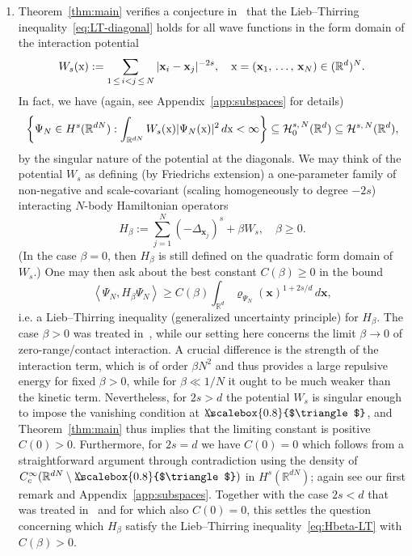 \documentclass[10pt]{amsart}
\theoremstyle{definition}\newtheorem{defi}[theo]{Definition}\newtheorem{rema}[theo]{Remark}\newtheorem{exam}[theo]{Example}\newtheorem{exem}[theo]{Example}\newtheorem{nota}[theo]{Notation}
\newcommand*\R {\mathbb{R}}
\newcommand\1{{\ensuremath {\mathds 1} }}
\newcommand{\bx}{\mathbf{x}}
\newcommand{\cH}{\mathcal{H}}
\newcommand{\sx}{\textup{x}}
\newcommand{\bDelta}{{\mbox{$\triangle$}\hspace{-8.6pt}\scalebox{0.8}{$\triangle$}}}
\begin{document}
\begin{enumerate}
\item Theorem~\ref{thm:main} verifies a conjecture in~\cite[p.~1362]{LunNamPor-16} that the Lieb--Thirring inequality~\eqref{eq:LT-diagonal} holds for all wave functions in the form domain of the interaction potential
\[
W_s(\sx) := \sum_{1\,\le\,i<j\,\le\,N} |\bx_i-\bx_j|^{-2s}, \quad \sx=(\bx_1,\,\ldots,\,\bx_N)\in (\R^d)^N.
\]
In fact, we have (again, see Appendix~\ref{app:subspaces} for details)
\begin{equation}\label{eq:interaction-form-domain}
\biggl\{\Psi_N\in H^s(\R^{dN}): \int_{\R^{dN}} W_s(\sx) |\Psi_N(\sx)|^2 \,d\sx < \infty \biggr\}
\subseteq \cH_0^{s,\,N}(\R^d)
\subseteq \cH^{s,\,N}(\R^d),
\end{equation}
by the singular nature of the potential at the diagonals. We may think of the potential $W_s$ as defining (by Friedrichs extension) a one-parameter family of non-negative and scale-covariant (scaling homogeneously to degree $-2s$) interacting $N$-body Hamiltonian operators
\[
H_\beta := \sum_{j=1}^N (-\Delta_{\bx_j})^s + \beta W_s,
\quad \beta \ge 0.
\]
(In the case $\beta=0$, then $H_\beta$ is still defined on the quadratic form domain of $W_s$.) One may then ask about the best constant $C(\beta)\ge 0$ in the bound
\begin{equation}\label{eq:Hbeta-LT}
\left\langle \Psi_N, H_\beta \Psi_N \right\rangle \ge C(\beta)\int_{\R^d}\varrho_{\Psi_N}(\bx)^{1+2s/d}\,d\bx,
\end{equation}
i.e. a Lieb--Thirring inequality (generalized uncertainty principle) for $H_\beta$. The case $\beta>0$ was treated in~\cite{LunPorSol-15,LunNamPor-16}, while our setting here concerns the limit $\beta \to 0$ of zero-range/contact interaction. A crucial difference is the strength of the interaction term, which is of order $\beta N^2$ and thus provides a large repulsive energy for fixed $\beta > 0$, while for $\beta \ll 1/N$ it ought to be much weaker than the kinetic term. Nevertheless, for $2s > d$ the potential $W_s$ is singular enough to impose the vanishing condition at $\bDelta$, and Theorem~\ref{thm:main} thus implies that the limiting constant is positive $C(0)>0$. Furthermore, for $2s=d$ we have $C(0)=0$ which follows from a straightforward argument through contradiction using the density of $C_c^\infty(\R^{dN}\setminus\bDelta)$ in $H^s(\R^{dN})$; again see our first remark and Appendix~\ref{app:subspaces}. Together with the case $2s<d$ that was treated in~\cite{LunNamPor-16} and for which also $C(0)=0$, this settles the question concerning which $H_\beta$ satisfy the Lieb--Thirring inequality~\eqref{eq:Hbeta-LT} with $C(\beta)>0$.




\end{enumerate}
\end{document}
